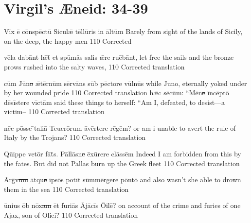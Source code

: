 \documentclass[]{article}
\begin{document}
\section*{Virgil's {\AE}neid:  34-39} %


\latline
  {V\=ix \={\macron e} c\={\macron o}nsp\=ect\={\macron u} S\-ic\-ul\={\ae} t\=ell\={\macron u}r\-is \-in \=alt\=um }
  {Barely from sight of the lands of Sicily, on the deep, the happy men}
  {110} %
  {Corrected}
  {
  }

\latline
  {v\={\macron e}l\-a d\-ab\=ant l\={\ae}t\={\macron{\i}}\sout{ e}t sp\={\macron u}m\={\macron a}s s\-al\-is \={\ae}r\-e r\-u\={\macron e}b\=ant,}
  {let free the sails and the bronze prows rushed into the salty waves,  }
  {110} %
  {Corrected translation}
  {
  }

\latline
  {c\=um J\={\macron u}n\sout{o }\={\ae}t\=ern\=um s\=erv\={\macron a}ns s\=ub p\=ect\-or\-e v\=uln\={\macron u}s}
  {while Juno, eternally yoked under by her wounded pride}
  {110} %
  {Corrected translation}
  {
  }
\newpage
\latline
  {h\={\ae}c s\={\macron e}c\=um:  ``M\={\macron e}n\sout{e }\=inc\=ept\={\macron o} d\={\macron e}s\=ist\-er\-e v\=ict\=am}
  {said these things to herself:  ``Am I, defeated, to desist---a victim--}
  {110} %
  {Corrected translation}
  {
  }

\latline
  {n\=ec p\=oss\sout{e }\={}t\-al\-i\={\macron a} T\-e\-ucr\={\macron o}r\sout{um }\={\macron a}v\=ert\-er\-e r\={\macron e}g\=em?}
  {or am i unable to avert the rule of Italy by the Trojans? }
  {110} %
  {Corrected translation}
  {
  }

\latline
  {Q\={ui}pp\-e v\-et\=or f\={\macron a}t\={\macron{\i}}s.  P\=all\=asn\sout{e }\=ex\={\macron u}r\-er\-e cl\=ass\=em}
  {Indeed I am forbidden from this by the fates.  But did not Pallas burn up the Greek fleet }
  {110} %
  {Corrected translation}
  {
  }

\newpage

\latline
  {\=Arg\={\macron{\i}}v\sout{um }\=atqu\sout{e }\=ips\={\macron o}s p\-ot\=it s\=umm\=erg\-er\-e p\=ont\={\macron o}}
  {and also wasn't she able to drown them in the sea}
  {110} %
  {Corrected translation}
  {
  }

\latline
  {\={\macron u}n\-i\-us \=ob n\=ox\sout{am }\=et f\-ur\-i\={\macron a}s \=Aj\={\macron a}c\=is \={Oi}l\={e\={\macron{\i}}}?}
  {on account of the crime and furies of one Ajax, son of Oliei?}
  {110} %
  {Corrected translation}
  {
  }
\end{document}
